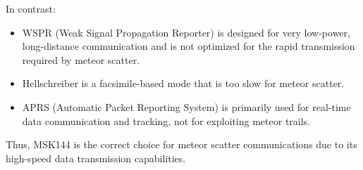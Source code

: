 In contrast:
\begin{itemize}
    \item WSPR (Weak Signal Propagation Reporter) is designed for very low-power, long-distance communication and is not optimized for the rapid transmission required by meteor scatter.
    \item Hellschreiber is a facsimile-based mode that is too slow for meteor scatter.
    \item APRS (Automatic Packet Reporting System) is primarily used for real-time data communication and tracking, not for exploiting meteor trails.
\end{itemize}

Thus, MSK144 is the correct choice for meteor scatter communications due to its high-speed data transmission capabilities.

